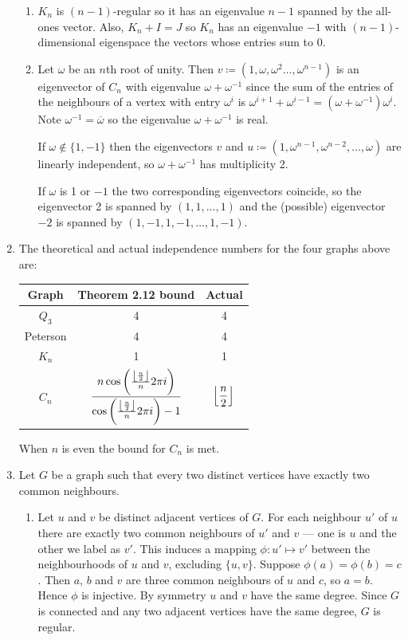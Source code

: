 \documentclass[a4paper, 12pt]{article}
\DeclarePairedDelimiter\floor{\lfloor}{\rfloor}
\begin{document}
\begin{enumerate}
\begin{enumerate}
\item \(K_n\) is \((n-1)\)-regular so it has an eigenvalue \(n-1\) spanned by the all-ones vector. Also, \(K_n+I=J\) so \(K_n\) has an eigenvalue \(-1\) with \((n-1)\)-dimensional eigenspace the vectors whose entries sum to 0.

\item Let \(\omega\) be an \(n\)th root of unity. Then \(v\coloneqq(1,\omega,\omega^2\dots,\omega^{n-1})\) is an eigenvector of \(C_n\) with eigenvalue \(\omega+\omega^{-1}\) since the sum of the entries of the neighbours of a vertex with entry \(\omega^i\) is \(\omega^{i+1}+\omega^{i-1}=(\omega+\omega^{-1})\omega^i\). Note \(\omega^{-1}=\overline\omega\) so the eigenvalue \(\omega+\omega^{-1}\) is real.

If \(\omega\notin\{1,-1\}\) then the eigenvectors \(v\) and \(u\coloneqq(1,\omega^{n-1},\omega^{n-2},\dots,\omega)\) are linearly independent, so \(\omega+\omega^{-1}\) has multiplicity 2.

If \(\omega\) is 1 or \(-1\) the two corresponding eigenvectors coincide, so the eigenvector 2 is spanned by \((1,1,\dots,1)\) and the (possible) eigenvector \(-2\) is spanned by \((1,-1,1,-1,\dots,1,-1)\).

\end{enumerate}

\item The theoretical and actual independence numbers for the four graphs above are:
\begin{center}
\begin{tabular}{@{}ccc@{}}\toprule
Graph&Theorem 2.12 bound&Actual\\\midrule
\(Q_3\)&4&4\\
Peterson&4&4\\
\(K_n\)&1&1\\
\(C_n\)&\(\displaystyle \frac{n\cos\left(\frac{\floor*{\frac n2}}n2\pi i\right)}{\cos\left(\frac{\floor*{\frac n2}}n2\pi i\right)-1}\)&\(\displaystyle\floor*{\frac n2}\)\\
\bottomrule
\end{tabular}
\end{center}
When \(n\) is even the bound for \(C_n\) is met.

\item Let \(G\) be a graph such that every two distinct vertices have exactly two common neighbours.

\begin{enumerate}

\item Let \(u\) and \(v\) be distinct adjacent vertices of \(G\). For each neighbour \(u'\) of \(u\) there are exactly two common neighbours of \(u'\) and \(v\) --- one is \(u\) and the other we label as \(v'\). This induces a mapping \(\phi\colon u'\mapsto v'\) between the neighbourhoods of \(u\) and \(v\), excluding \(\{u,v\}\). Suppose \(\phi(a)=\phi(b)=c\). Then \(a\), \(b\) and \(v\) are three common neighbours of \(u\) and \(c\), so \(a=b\). Hence \(\phi\) is injective. By symmetry \(u\) and \(v\) have the same degree. Since \(G\) is connected and any two adjacent vertices have the same degree, \(G\) is regular.


\end{enumerate}
\end{enumerate}
\end{document}
